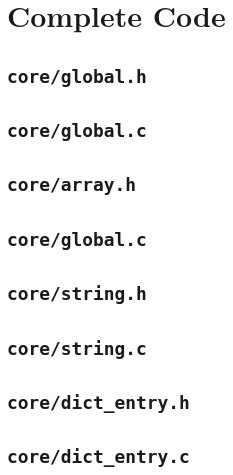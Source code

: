 \documentclass[../main.tex]{subfiles}
\begin{document}
\section{Complete Code}

\localtableofcontents

\subsection{\texttt{core/global.h}}


\subsection{\texttt{core/global.c}}


\subsection{\texttt{core/array.h}}


\subsection{\texttt{core/global.c}}


\subsection{\texttt{core/string.h}}


\subsection{\texttt{core/string.c}}


\subsection{\texttt{core/dict\_entry.h}}


\subsection{\texttt{core/dict\_entry.c}}

\end{document}
